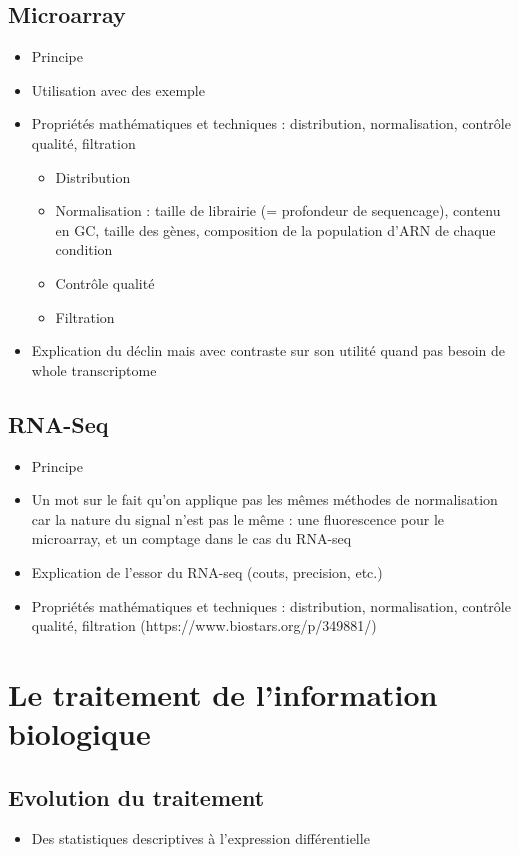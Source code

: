 \subsection{Microarray}
\begin{itemize}
\item Principe
\item Utilisation avec des exemple
\item Propriétés mathématiques et techniques : distribution, normalisation, contrôle qualité, filtration
\begin{itemize}
    \item Distribution
    \item Normalisation : taille de librairie (= profondeur de sequencage), contenu en GC, taille des gènes, composition de la population d'ARN de chaque condition
    \item Contrôle qualité
    \item Filtration
\end{itemize}
\item Explication du déclin mais avec contraste sur son utilité quand pas besoin de whole transcriptome
\end{itemize}

\subsection{RNA-Seq}
\begin{itemize}
\item Principe
\item Un mot sur le fait qu'on applique pas les mêmes méthodes de normalisation car la nature du signal n'est pas le même : une fluorescence pour le microarray, et un comptage dans le cas du RNA-seq
\item Explication de l'essor du RNA-seq (couts, precision, etc.)
\item Propriétés mathématiques et techniques : distribution, normalisation, contrôle qualité, filtration (https://www.biostars.org/p/349881/)
\end{itemize}

\section{Le traitement de l'information biologique}
\subsection{Evolution du traitement}
\begin{itemize}
\item Des statistiques descriptives à l'expression différentielle
\end{itemize}

